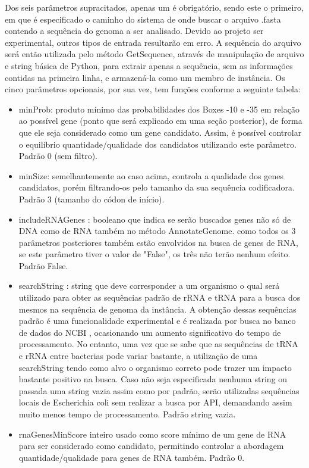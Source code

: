 \documentclass[brazilian,12pt,a4paper,final]{article}
\begin{document}
	Dos seis parâmetros supracitados, apenas um é obrigatório, sendo este o primeiro, em que é especificado o caminho
	do sistema de onde buscar o arquivo .fasta contendo a sequência do genoma a ser analisado. Devido ao projeto ser
	experimental, outros tipos de entrada resultarão em erro. A sequência do arquivo será então utilizada pelo método
	GetSequence, através de manipulação de arquivo e string básica de Python, para extrair apenas a sequência, sem as informações
	contidas na primeira linha, e armazená-la como um membro de instância. Os cinco parâmetros opcionais, por sua vez, tem funções 
	conforme a seguinte tabela:
	
	\vspace{0.5cm}
		
	\begin{itemize}
		\item minProb: produto mínimo das probabilidades dos Boxes -10 e -35 em relação ao possível gene (ponto
						que será explicado em uma seção posterior), de forma que ele seja
						considerado como um gene candidato. Assim, é possível controlar o equilíbrio quantidade/qualidade
						dos candidatos utilizando este parâmetro. Padrão 0 (sem filtro).
						
		\item minSize: semelhantemente ao caso acima, controla a qualidade dos genes candidatos, porém filtrando-os pelo
						tamanho da sua sequência codificadora. Padrão 3 (tamanho do códon de início).
						
		\item includeRNAGenes : booleano que indica se serão buscados genes não só de DNA como de RNA também no método 
								AnnotateGenome. como todos os 3 parâmetros posteriores também estão envolvidos na busca
								de genes de RNA, se este parâmetro tiver o valor de "False", os três não terão nenhum efeito.
								Padrão False.
		\item  searchString : string que deve corresponder a um organismo o qual será utilizado para obter as sequências padrão
								de rRNA e tRNA para a busca dos mesmos na sequência de genoma da instância. A obtenção dessas 
								sequências padrão é uma funcionalidade experimental e é realizada por busca no banco de dados do NCBI
								, ocasionando um aumento significativo do tempo de processamento. No entanto, uma vez que se sabe que as sequências de tRNA e rRNA entre bacterias pode variar bastante, a utilização de uma searchString tendo como alvo o organismo correto pode trazer um impacto bastante positivo na busca. Caso não seja especificada nenhuma string
								ou passada uma string vazia assim como por padrão, serão utilizadas sequências locais de Escherichia coli sem 
								realizar a busca por API, demandando assim muito menos tempo de processamento. 
								Padrão string vazia.							    
		\item rnaGenesMinScore inteiro usado como score mínimo de um gene de RNA para ser considerado como candidato, permitindo controlar a abordagem quantidade/qualidade para genes de RNA também. Padrão 0.
	\end{itemize}
								
\end{document}
